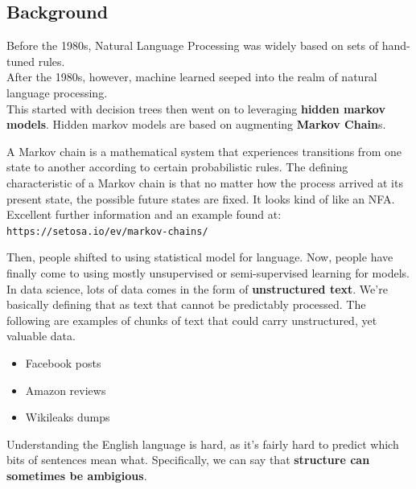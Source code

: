 \documentclass[english, 10pt]{article}
\begin{document}
\subsection{Background}

Before the 1980s, Natural Language Processing was widely based on sets of hand-tuned rules.\\

After the 1980s, however, machine learned seeped into the realm of natural language processing.\\

This started with decision trees then went on to leveraging \textbf{hidden markov models}. Hidden markov models are based on augmenting \textbf{Markov Chain}s.\\

\begin{tcolorbox}[title=Aside: Markov Chains,colframe=black,colback=white,arc=0pt,fonttitle=\bfseries]
A Markov chain is a mathematical system that experiences transitions from one state to another according to certain probabilistic rules. The defining characteristic of a Markov chain is that no matter how the process arrived at its present state, the possible future states are fixed. It looks kind of like an NFA.\\

Excellent further information and an example found at:\\
\texttt{https://setosa.io/ev/markov-chains/}
\end{tcolorbox}

\hfill \break Then, people shifted to using statistical model for language. Now, people have finally come to using mostly unsupervised or semi-supervised learning for models.\\

In data science, lots of data comes in the form of \textbf{unstructured text}. We're basically defining that as text that cannot be predictably processed. The following are examples of chunks of text that could carry unstructured, yet valuable data.

\begin{itemize}
	\item Facebook posts
	\item Amazon reviews
	\item Wikileaks dumps
\end{itemize}

Understanding the English language is hard, as it's fairly hard to predict which bits of sentences mean what. Specifically, we can say that \textbf{structure can sometimes be ambigious}.\\
\end{document}
